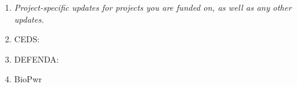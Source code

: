 \begin{enumerate}
    \item \textit{Project-specific updates for projects you are funded on, as well as any other updates.}
    \item CEDS:
    \item DEFENDA:
    \item BioPwr
\end{enumerate}